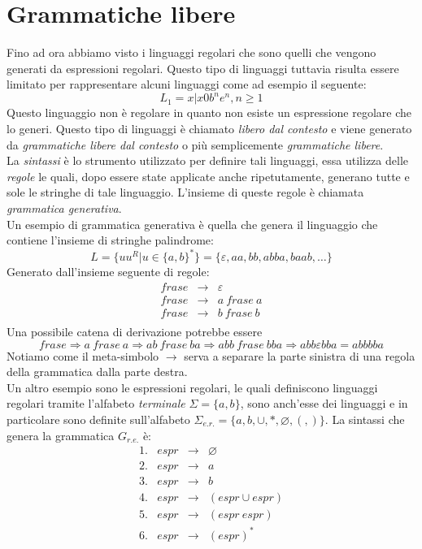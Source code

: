 \section{Grammatiche libere}
Fino ad ora abbiamo visto i linguaggi regolari che sono quelli che vengono generati da espressioni regolari. Questo tipo di linguaggi tuttavia risulta essere limitato per rappresentare alcuni linguaggi come ad esempio il seguente:
$$L_1 = {x | x 0 b^ne^n, n\geq 1}$$
Questo linguaggio non è regolare in quanto non esiste un espressione regolare che lo generi. Questo tipo di linguaggi è chiamato \emph{libero dal contesto} e viene generato da \emph{grammatiche libere dal contesto} o più semplicemente \emph{grammatiche libere}.\\
La \emph{sintassi} è lo strumento utilizzato per definire tali linguaggi, essa utilizza delle \emph{regole} le quali, dopo essere state applicate anche ripetutamente, generano tutte e sole le stringhe di tale linguaggio.
L'insieme di queste regole è chiamata \emph{grammatica generativa}.\\
Un esempio di grammatica generativa è quella che genera il linguaggio che contiene l'insieme di stringhe palindrome:
$$L = \{uu^R | u \in \{a,b \}^*\} = \{\varepsilon,aa,bb,abba,baab,\dots\}$$
Generato dall'insieme seguente di regole:
$$
\begin{array}{ccl}
frase & \rightarrow & \varepsilon\\
frase & \rightarrow & a \ frase \ a \\
frase & \rightarrow & b \ frase \ b \\
\end{array}
$$
Una possibile catena di derivazione potrebbe essere
$$frase \Rightarrow a \ frase \ a \Rightarrow ab \ frase \ ba \Rightarrow abb \ frase \ bba \Rightarrow abb\varepsilon bba = abbbba$$
Notiamo come il meta-simbolo $ \rightarrow $ serva a separare la parte sinistra di una regola della grammatica dalla parte destra.\\
Un altro esempio sono le espressioni regolari, le quali definiscono linguaggi regolari tramite l'alfabeto \emph{terminale} $ \Sigma = \{a,b\}$,  sono anch'esse dei linguaggi e in particolare sono definite sull'alfabeto $ \Sigma_{e.r.} = \{a,b,\cup, \ast, \varnothing, (, ) \} $. La sintassi che genera la grammatica $ G_{r.e.} $ è:
$$\begin{array}{llcl}
1. & espr & \rightarrow & \varnothing \\
2. & espr & \rightarrow & a \\
3. & espr & \rightarrow & b\\
4. & espr & \rightarrow & (espr\cup espr) \\
5. & espr & \rightarrow & (espr \ espr) \\
6. & espr & \rightarrow & (espr)^* \\
\end{array}$$
